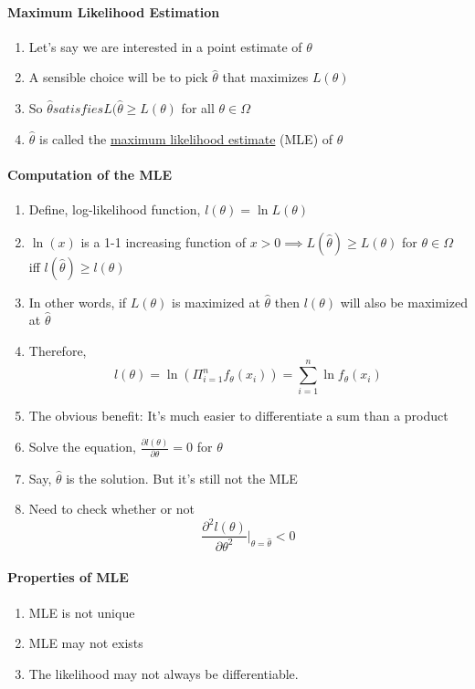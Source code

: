 \documentclass[11pt]{article}
\newcommand{\under}[1]{\underline{#1}}
\begin{document}
\paragraph{Maximum Likelihood Estimation}
\begin{enumerate}
	\item Let's say we are interested in a point estimate of $\theta$
	\item A sensible choice will be to pick $\hat{\theta}$ that maximizes $L(\theta)$
	\item So $\hat{\theta} satisfies L(\hat{\theta} \geq L(\theta)$ for all $\theta \in \Omega$
	\item $\hat{\theta}$ is called the \under{maximum likelihood estimate} (MLE) of $\theta$
\end{enumerate}
\paragraph{Computation of the MLE}
\begin{enumerate}
	\item Define, log-likelihood function, $l(\theta) = \ln{L(\theta)}$
	\item $\ln(x)$ is a 1-1 increasing function of $x > 0 \implies L(\hat{\theta}) \geq L(\theta)$ for $\theta \in \Omega$ iff $l(\hat{\theta}) \geq l(\theta)$
	\item In other words, if $L(\theta)$ is maximized at $\hat{\theta}$ then $l(\theta)$ will also be maximized at $\hat{\theta}$
	\item Therefore, $$l(\theta) = \ln{(\Pi_{i=1}^nf_\theta(x_i))} = \sum_{i=1}^n\ln{f_\theta(x_i)}$$
	\item The obvious benefit: It's much easier to differentiate a sum than a product
	\item Solve the equation, $\frac{\partial l(\theta)}{\partial \theta} = 0$ for $\theta$
	\item Say, $\hat{\theta}$ is the solution. But it's still not the MLE
	\item Need to check whether or not $$\frac{\partial^2 l(\theta)}{\partial \theta^2}\vert_{\theta = \hat{\theta}} < 0$$
\end{enumerate}
\paragraph{Properties of MLE}
\begin{enumerate}
	\item MLE is not unique
	\item MLE may not exists
	\item The likelihood may not always be differentiable.
\end{enumerate}
\end{document}
